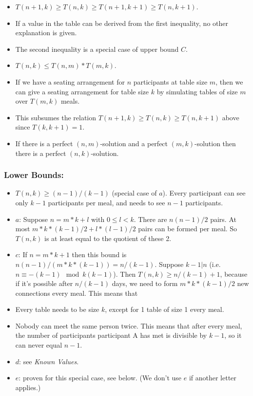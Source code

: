 \documentclass[a4paper]{article}
\begin{document}
\begin{itemize}
\item
  $T(n+1,k)\geq T(n,k)\geq T(n+1,k+1)\geq T(n,k+1)$.
\item
  If a value in the table can be derived from the first inequality, no
  other explanation is given.
\item
  The second inequality is a special case of upper bound $C$.
\item
  $T(n,k)\leq T(n,m)*T(m,k)$.
\item
  If we have a seating arrangement for $n$ participants at table
  size $m$, then we can give a seating arrangement for table size
  $k$ by simulating tables of size $m$ over
  $T(m,k)$ meals.
\item
  This subsumes the relation $T(n+1,k)\geq T(n,k)\geq T(n,k+1)$
  above since $T(k,k+1)=1$.
\item
  If there is a perfect $(n,m)$-solution and a perfect
  $(m,k)$-solution then there is a perfect
  $(n,k)$-solution.
\end{itemize}

\subsubsection{Lower Bounds:}\label{lower-bounds}

\begin{itemize}

\item
  $T(n,k)\geq (n-1)/(k-1)$ (special case of $a$). Every
  participant can see only $k-1$ participants per meal, and needs
  to see $n-1$ participants.
\item
  $a$: Suppose $n=m*k+l$ with
  $0\leq l<k$. There are $n(n-1)/2$ pairs.
  At most $m*k*(k-1)/2+l*(l-1)/2$ pairs can be formed per meal.
  So $T(n,k)$ is at least equal to the quotient of these 2.
\item
  $c$: If $n=m*k+1$ then this bound is
  $n(n-1)/(m*k*(k-1))=n/(k-1)$. Suppose
  $k-1|n$ (i.e.
  $n\equiv -(k-1)\mod k(k-1)$). Then
  $T(n,k)\geq n/(k-1)+1$, because if it's possible after
  $n/(k-1)$ days, we need to form $m*k*(k-1)/2$ new
  connections every meal. This means that
\item
  Every table needs to be size $k$, except for 1 table of size 1
  every meal.
\item
  Nobody can meet the same person twice. This means that after every
  meal, the number of participants participant A has met is divisible by
  $k-1$, so it can never equal $n-1$.
\item
  $d$: see \emph{Known Values}.
\item
  $e$: proven for this special case, see below. (We don't use
  $e$ if another letter applies.)
\end{itemize}
\end{document}
